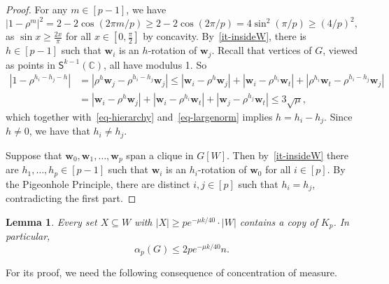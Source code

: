 \documentclass[10pt,a4paper]{article}
\newcommand{\V}[1]{\mathbold{#1}}
\newtheorem{lemma}[theorem]{Lemma}
\theoremstyle{definition}
\newcommand{\sS}{\mathsf{S}}
\newcommand{\sC}{\mathbb{C}}
\begin{document}
\begin{proof}
	For any $m \in [p-1]$, we have
	\begin{equation}\label{eq-largenorm}
		|1-\rho^m|^2 = 2-2\cos \left(2\pi m/p\right) \geq 2-2\cos\left(2\pi/p\right) = 4\sin^2 \left(\pi/p\right) \geq \left(4/p\right)^2,
	\end{equation}
	as $\sin x\ge \frac{2x}{\pi}$ for all $x\in[0,\frac{\pi}{2}]$ by concavity.
	By~\ref{it-insideW}, there is $h\in [p-1]$ such that $\V{w}_i$ is an $h$-rotation of $\V{w}_j$. Recall that vertices of $G$, viewed as points in $\sS^{k-1}(\sC)$, all have modulus 1.
	So
	\begin{align*}
		|1-\rho^{h_i-h_j-h}| &= |\rho^h\V{w}_j-\rho^{h_i-h_j}\V{w}_j| \leq |\V{w}_i-\rho^h\V{w}_j| + |\V{w}_i-\rho^{h_i}\V{w}_t| + |\rho^{h_i}\V{w}_t-\rho^{h_i-h_j}\V{w}_j|\\
		&= |\V{w}_i-\rho^h\V{w}_j| + |\V{w}_i-\rho^{h_i}\V{w}_t| + |\V{w}_j-\rho^{h_j}\V{w}_t| \leq 3\sqrt{\mu},
	\end{align*}
	which together with~\eqref{eq-hierarchy} and~\eqref{eq-largenorm} implies $h=h_i-h_j$. Since $h\neq 0$, we have that $h_i \neq h_j$.
	
	Suppose that $\V{w}_0,\V{w}_1,\ldots,\V{w}_{ p}$ span a clique in $G[W]$. Then by~\ref{it-insideW} there are $h_1,\ldots,h_ p \in [p-1]$ such that $\V{w}_i$ is an $h_i$-rotation of $\V{w}_0$ for all $i \in [ p]$.
	By the Pigeonhole Principle, there are distinct $i,j \in [ p]$ such that $h_i=h_j$, contradicting the first part.
\end{proof}

\begin{lemma}\label{lem-independenceGBEoneside}
	Every set $X\subseteq W$ with $|X|\ge pe^{-\mu k/40}\cdot|W|$ contains a copy of $K_p$. In particular, $$\alpha_p(G)\le 2pe^{-\mu k/40}n.$$
\end{lemma}

For its proof, we need the following consequence of concentration of measure.
\end{document}
